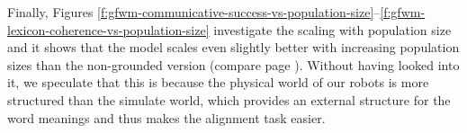 Finally, Figures
\ref{f:gfwm-communicative-success-vs-population-size}--\ref{f:gfwm-lexicon-coherence-vs-population-size}
investigate the scaling with population size and it shows that the
model scales even slightly better with increasing population sizes
than the non-grounded version (compare page
\pageref{f:gfwm-communicative-success-vs-population-size}). Without
having looked into it, we speculate that this is because the physical
world of our robots is more structured than the simulate world, which
provides an external structure for the word meanings and thus makes
the alignment task easier.
 




